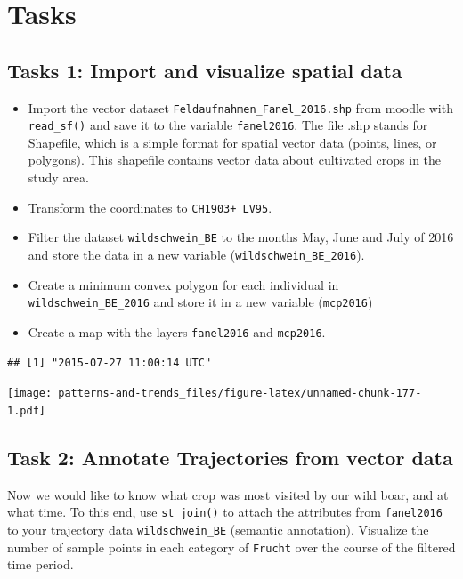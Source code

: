 \documentclass[]{book}
\providecommand{\tightlist}{%
  \setlength{\itemsep}{0pt}\setlength{\parskip}{0pt}}
\begin{document}
\hypertarget{tasks}{%
\section{Tasks}\label{tasks}}

\hypertarget{tasks-1-import-and-visualize-spatial-data}{%
\subsection{Tasks 1: Import and visualize spatial data}\label{tasks-1-import-and-visualize-spatial-data}}

\begin{itemize}
\tightlist
\item
  Import the vector dataset \texttt{Feldaufnahmen\_Fanel\_2016.shp} from moodle with \texttt{read\_sf()} and save it to the variable \texttt{fanel2016}. The file .shp stands for Shapefile, which is a simple format for spatial vector data (points, lines, or polygons). This shapefile contains vector data about cultivated crops in the study area.
\item
  Transform the coordinates to \texttt{CH1903+\ LV95}.
\item
  Filter the dataset \texttt{wildschwein\_BE} to the months May, June and July of 2016 and store the data in a new variable (\texttt{wildschwein\_BE\_2016}).
\item
  Create a minimum convex polygon for each individual in \texttt{wildschwein\_BE\_2016} and store it in a new variable (\texttt{mcp2016})
\item
  Create a map with the layers \texttt{fanel2016} and \texttt{mcp2016}.
\end{itemize}

\begin{verbatim}
## [1] "2015-07-27 11:00:14 UTC"
\end{verbatim}

\texttt{[image: patterns-and-trends\_files/figure-latex/unnamed-chunk-177-1.pdf]}

\hypertarget{task-2-annotate-trajectories-from-vector-data}{%
\subsection{Task 2: Annotate Trajectories from vector data}\label{task-2-annotate-trajectories-from-vector-data}}

Now we would like to know what crop was most visited by our wild boar, and at what time. To this end, use \texttt{st\_join()} to attach the attributes from \texttt{fanel2016} to your trajectory data \texttt{wildschwein\_BE} (semantic annotation). Visualize the number of sample points in each category of \texttt{Frucht} over the course of the filtered time period.
\end{document}

